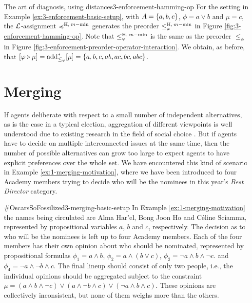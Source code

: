 \begin{xmpl}{The art of diagnosis, using distances}{3-enforcement-hamming-op}
	For the setting in Example \ref{ex:3-enforcement-basic-setup},
	with 
	$A=\{a,b,c\}$,
	$\phi=a\lor b$ and $\mu=c$, 
	the $\mathcal{L}$-assignment $\preccurlyeq^{{\operatorname{H}},\:m-{\operatorname{min}}}$ 
	generates the preorder $\le^{{\operatorname{H}},\:m-{\operatorname{min}}}_{\varphi}$  
	in Figure \ref{fig:3-enforcement-hamming-op}.
	Note that $\le^{{\operatorname{H}},\:m-{\operatorname{min}}}_{\varphi}$ is the same
	as the preorder $\le_{\phi}$ in Figure \ref{fig:3-enforcement-preorder-operator-interaction}.
	We obtain, as before, that $[\varphi\triangleright\mu]={\operatorname{add}}^{\ast}_{\le_{\varphi}}[\mu]=\{a,b,c,ab,ac,bc,abc\}$.
\end{xmpl}























\section{Merging}\label{sec:3-merging}
If agents deliberate with respect 
to a small number of independent alternatives, 
as is the case in a typical election, 
aggregation of different viewpoints 
is well understood due to existing research 
in the field of social choice \cite{Zwicker16,BaumeisterR16}.
But if agents have to decide on multiple 
interconnected issues at the same time,
then the number of possible alternatives 
can grow too large to expect agents 
to have explicit preferences over the whole set.
We have encountered this kind of scenario 
in Example \ref{ex:1-merging-motivation},
where we have been introduced to four 
Academy members trying to decide who will 
be the nominees in this year's \emph{Best Director} category.

\begin{xmpl}{$\#$OscarsSoFossilized}{3-merging-basic-setup}
	In Example \ref{ex:1-merging-motivation}
	the names being circulated are Alma Har'el, Bong Joon Ho and C\'eline Sciamma,
	represented by propositional variables
	$a$, $b$ and $c$, respectively.
	The decision as to who will be the nominees
	is left up to four Academy members.
	Each of the four members has their own opinion 
	about who should be nominated, represented by propositional formulas 
	$\phi_1 = a\land b$,
	$\phi_2 = a\land (b\lor c)$,
	$\phi_3 = \lnot a\land b \land \lnot c$.
	and
	$\phi_4 = \lnot a \land\lnot b\land c$.
	The final lineup should consist of only two people,
	i.e., the individual opinions should be aggregated subject to the constraint
	$\mu=(a\land b\land \lnot c)\lor (a\land\lnot b\land c)\lor(\lnot a\land b\land c)$.
	These opinions are collectively inconsistent, 
	but none of them weighs more than the others.
\end{xmpl}

